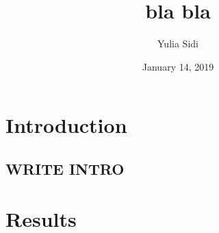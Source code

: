 \documentclass{beamer}
\title[bla]{bla bla}
\author[Yulia Sidi]{{\footnotesize Yulia Sidi}}
\institute[UConn]{Applied General Exam \\ 
Department of Statistics, University of Connecticut}
\date[January 14, 2019]{{\scriptsize January 14, 2019}}
\begin{document}
\begin{frame}
\titlepage
\end{frame}


\section{Introduction}

\subsection{WRITE INTRO}

\begin{frame}{}{}
\end{frame}

\section{Results}
\end{document}
